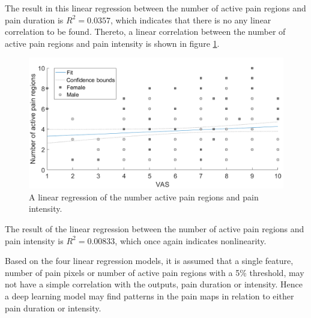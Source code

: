 \noindent
The result in this linear regression between the number of active pain regions and pain duration is $R^2=0.0357$, which indicates that there is no any linear correlation to be found.\newline
Thereto, a linear correlation between the number of active pain regions and pain intensity is shown in figure \ref{fig:regPain}.

\begin{figure} [H]
\centering
\includegraphics[width=1\textwidth]{figures/vasregion}
\caption{A linear regression of the number active pain regions and pain intensity.}
\label{fig:regPain}
\end{figure}

\noindent
The result of the linear regression between the number of active pain regions and pain intensity is $R^2=0.00833$, which once again indicates nonlinearity. 

\noindent
Based on the four linear regression models, it is assumed that a single feature, number of pain pixels or number of active pain regions with a 5\% threshold, may not have a simple correlation with the outputs, pain duration or intensity. Hence a deep learning model may find patterns in the pain maps in relation to either pain duration or intensity.



